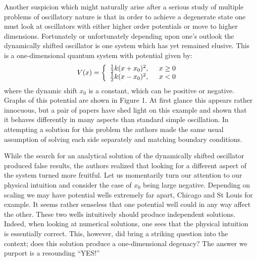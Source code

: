 \documentclass[12pt]{article}
\begin{document}
\par Another suspicion which might naturally arise after a serious study of multiple problems of oscillatory nature is that in order to achieve a degenerate state one must look at oscillators with either higher order potentials or move to higher dimensions. Fortunately or unfortunately depending upon one's outlook the dynamically shifted oscillator is one system which has yet remained elusive. This is a one-dimensional quantum system with potential given by:
\begin{equation}
V(x)=\left\{\begin{array}{l}
\frac{1}{2}k(x+x_0)^2,    \hspace{0.5cm}  x\ge0 \\
\frac{1}{2}k(x-x_0)^2,	 \hspace{0.5cm}  x<0		\label{DSO}
\end{array} \right.
\end{equation}
where the dynamic shift $x_0$ is a constant, which can be positive or negative. Graphs of this potential are shown in Figure 1. At first glance this appears rather innocuous, but a pair of papers \cite{Hartmann,mohazzabi} have shed light on this example and shown that it behaves differently in many aspects than standard simple oscillation. In attempting a solution for this problem the authors made the same usual assumption of solving each side separately and matching boundary conditions. 

\par While the search for an analytical solution of the dynamically shifted oscillator produced false results, the authors realized that looking for a different aspect of the system turned more fruitful. Let us momentarily turn our attention to our physical intuition and consider the case of $x_0$ being large negative. Depending on scaling we may have potential wells extremely far apart, Chicago and St Louis for example. It seems rather senseless that one potential well could in any way affect the other. These two wells intuitively should produce independent solutions. Indeed, when looking at numerical solutions, one sees that the physical intuition is essentially correct. This, however, did bring a striking question into the context; does this solution produce a one-dimensional degenacy? The answer we purport is a resounding ``YES!''  
\end{document}
